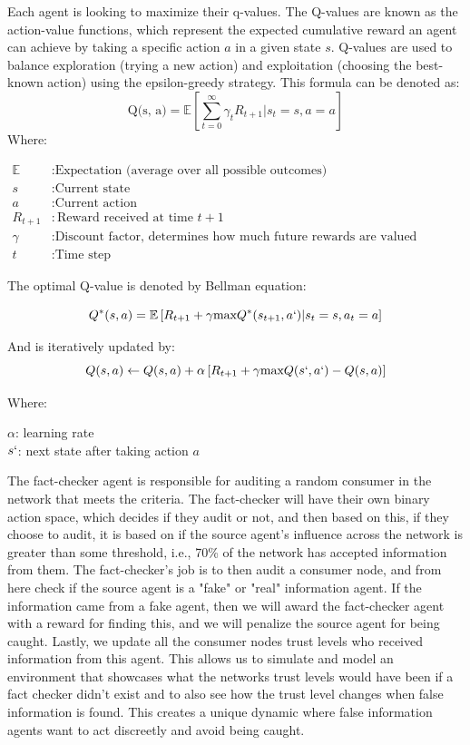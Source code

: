 \documentclass[twoside]{article}
\begin{document}
Each agent is looking to maximize their q-values. The Q-values are known as the action-value functions, which represent the expected cumulative reward an agent can achieve by taking a specific action $a$ in a given state $s$. Q-values are used to balance exploration (trying a new action) and exploitation (choosing the best-known action) using the epsilon-greedy strategy. This formula can be denoted as:
\[
\text{Q(s, a)} = \mathbb{E}\left[\sum_{t=0}^{\infty}\gamma_{t}R_{t + 1} | s_{t} = s, a = a\right]
\]
Where:

\[
\begin{aligned}
\mathbb{E} &: \text{Expectation (average over all possible outcomes)} \\
s &: \text{Current state} \\
a &: \text{Current action} \\
R_{t+1} &: \text{Reward received at time } t+1 \\
\gamma &: \text{Discount factor, determines how much future rewards are valued compared to immediate rewards} \\
t &: \text{Time step}
\end{aligned}
\]

The optimal Q-value is denoted by Bellman equation:

\[
Q^{*}(s, a) = \mathbb{E} \left[R_{t+1} + \gamma\text{max}Q^{*}(s_{t+1}, a`) | s_{t} = s, a_{t} = a\right]
\]

And is iteratively updated by:
\[
Q(s, a) \leftarrow Q(s, a) + \alpha \left[R_{t+1} + \gamma\text{max}Q(s`,a`) - Q(s, a)\right]
\]

Where:

$\alpha$: learning rate\\
$s`$: next state after taking action $a$


The fact-checker agent is responsible for auditing a random consumer in the network that meets the criteria. The fact-checker will have their own binary action space, which decides if they audit or not, and then based on this, if they choose to audit, it is based on if the source agent's influence across the network is greater than some threshold, i.e., 70\% of the network has accepted information from them. The fact-checker's job is to then audit a consumer node, and from here check if the source agent is a "fake" or "real" information agent. If the information came from a fake agent, then we will award the fact-checker agent with a reward for finding this, and we will penalize the source agent for being caught. Lastly, we update all the consumer nodes trust levels who received information from this agent. This allows us to simulate and model an environment that showcases what the networks trust levels would have been if a fact checker didn't exist and to also see how the trust level changes when false information is found. This creates a unique dynamic where false information agents want to act discreetly and avoid being caught.
\end{document}
